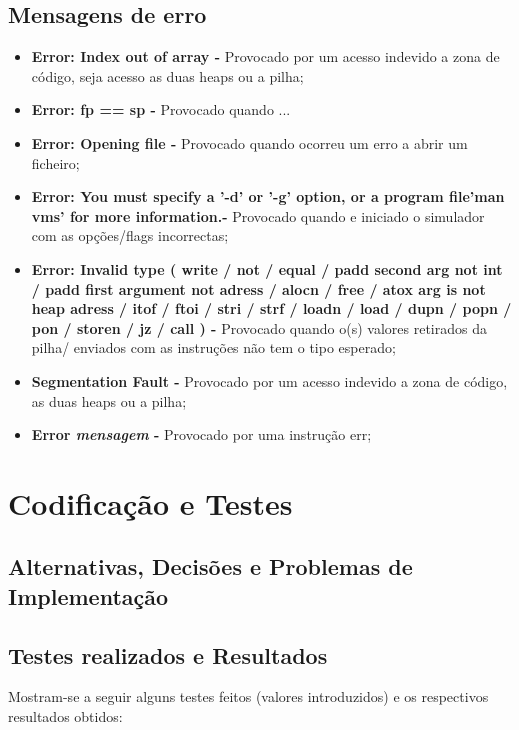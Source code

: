 \documentclass{report}
\begin{document}
\section{Mensagens de erro}

\begin{itemize}
\item \textbf{Error: Index out of array - } Provocado por um acesso indevido a zona de código, seja acesso as duas heaps ou a pilha;
\item \textbf{Error: fp == sp - } Provocado quando ...
\item \textbf{Error: Opening file - } Provocado quando ocorreu um erro a abrir um ficheiro;
\item \textbf{Error: You must specify a '-d' or '-g' option, or a program file\nTry 'man vms' for more information.\n - } Provocado quando e iniciado o simulador
com as opções/flags incorrectas;
\item \textbf{Error: Invalid type ( write / not / equal / padd second arg not int / padd first argument not adress / alocn / free /
 atox arg is not heap adress / itof / ftoi / stri / strf / loadn / load / dupn / popn / pon / storen / jz / call ) - } Provocado
 quando o(s) valores retirados da pilha/ enviados com as instruções não tem o tipo esperado;
\item \textbf{Segmentation Fault - } Provocado por um acesso indevido a zona de código, as duas heaps ou a pilha;
\item \textbf{Error \textit{mensagem} - } Provocado por uma instrução err;
\end{itemize}

\chapter{Codificação e Testes}

\section{Alternativas, Decisões e Problemas de Implementação}
\section{Testes realizados e Resultados}
Mostram-se a seguir alguns testes feitos (valores introduzidos) e
os respectivos resultados obtidos:
\end{document}
